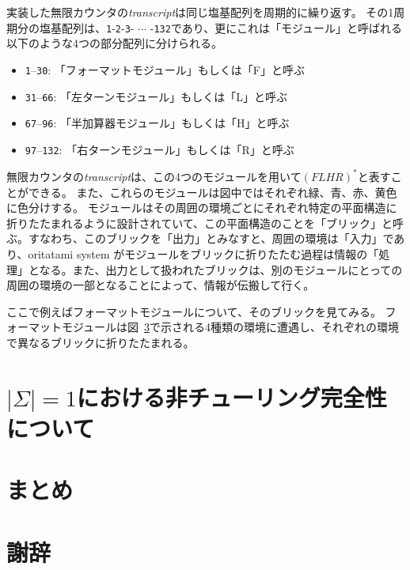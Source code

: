 \documentclass[a4j,11pt]{article}
\begin{document}
実装した無限カウンタの\textit{transcript}は同じ塩基配列を周期的に繰り返す。
その1周期分の塩基配列は、\texttt{1}-\texttt{2}-\texttt{3}- $\cdots$ -\texttt{132}であり、更にこれは「モジュール」と呼ばれる以下のような4つの部分配列に分けられる。

\begin{itemize}
\item \texttt{1}--\texttt{30}: 「フォーマットモジュール」もしくは「F」と呼ぶ
\item \texttt{31}--\texttt{66}: 「左ターンモジュール」もしくは「L」と呼ぶ
\item \texttt{67}--\texttt{96}: 「半加算器モジュール」もしくは「H」と呼ぶ
\item \texttt{97}--\texttt{132}: 「右ターンモジュール」もしくは「R」と呼ぶ
\end{itemize}

無限カウンタの\textit{transcript}は、この4つのモジュールを用いて$(FLHR)^*$と表すことができる。
また、これらのモジュールは図中ではそれぞれ緑、青、赤、黄色に色分けする。
モジュールはその周囲の環境ごとにそれぞれ特定の平面構造に折りたたまれるように設計されていて、この平面構造のことを「ブリック」と呼ぶ。すなわち、このブリックを「出力」とみなすと、周囲の環境は「入力」であり、oritatami system がモジュールをブリックに折りたたむ過程は情報の「処理」となる。また、出力として扱われたブリックは、別のモジュールにとっての周囲の環境の一部となることによって、情報が伝搬して行く。

ここで例えばフォーマットモジュールについて、そのブリックを見てみる。
フォーマットモジュールは図~\ref{}で示される4種類の環境に遭遇し、それぞれの環境で異なるブリックに折りたたまれる。

\section{$| \Sigma | = 1$における非チューリング完全性について}

\section{まとめ}

\section{謝辞}



\end{document}
